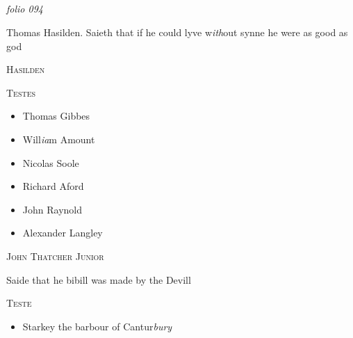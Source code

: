 \documentclass[12pt, a4paper]{book}
\begin{document}
            
\dotfill
						\newpage {} \subsection*{}  \subsection*{}  \subsection*{}

\textit{folio 094}


 	
		\ifthenelse{\isodd{\thepage}}
		{\reversemarginpar}
		{\normalmarginpar}
		Thomas Hasilden. Saieth that if he could
 lyve w\textit{ith}out synne he were as good as god

 

	
				\begin{center} \begin{large} {\scshape Hasilden} \end{large} \end{center}
			
	
		\begin{center} {\scshape Testes} \end{center}\begin{itemize}
			
			\item[]Thomas Gibbes
			\item[]Will\textit{ia}m Amount
			\item[]Nicolas Soole
			\item[]Richard Aford
			\item[]John Raynold
			\item[]Alexander Langley
		\end{itemize}
	

            
            	
				\begin{center} \begin{large} {\scshape John Thatcher Junior } \end{large} \end{center}
			

	
		\ifthenelse{\isodd{\thepage}}
		{\reversemarginpar}
		{\normalmarginpar}
		Saide that he bibill was made by the
 Devill
 \begin{center} {\scshape Teste} \end{center}\begin{itemize}
 	
 	\item[]Starkey the barbour of Cantur\textit{bury}
 \end{itemize}
 
\end{document}
